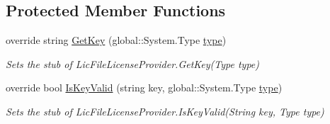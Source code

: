 \subsection*{Protected Member Functions}
\begin{DoxyCompactItemize}
\item 
override string \hyperlink{class_system_1_1_component_model_1_1_fakes_1_1_stub_lic_file_license_provider_a305a3ab5c944e0c27688981603afad75}{Get\-Key} (global\-::\-System.\-Type \hyperlink{jquery-1_810_82-vsdoc_8js_a3940565e83a9bfd10d95ffd27536da91}{type})
\begin{DoxyCompactList}\small\item\em Sets the stub of Lic\-File\-License\-Provider.\-Get\-Key(\-Type type)\end{DoxyCompactList}\item 
override bool \hyperlink{class_system_1_1_component_model_1_1_fakes_1_1_stub_lic_file_license_provider_a8a275182f226e5f7d1f3d2924a198e6e}{Is\-Key\-Valid} (string key, global\-::\-System.\-Type \hyperlink{jquery-1_810_82-vsdoc_8js_a3940565e83a9bfd10d95ffd27536da91}{type})
\begin{DoxyCompactList}\small\item\em Sets the stub of Lic\-File\-License\-Provider.\-Is\-Key\-Valid(\-String key, Type type)\end{DoxyCompactList}\end{DoxyCompactItemize}
